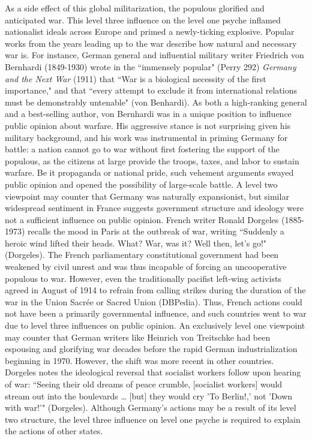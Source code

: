 \documentclass[letterpaper]{article}
\begin{document}
  As a side effect of this global militarization, the populous glorified and anticipated war. This level three influence on the level one psyche inflamed nationalist ideals across Europe and primed a newly-ticking explosive.
  Popular works from the years leading up to the war describe how natural and necessary war is.
  For instance, German general and influential military writer Friedrich von Bernhardi (1849-1930) wrote in the ``immensely popular" (Perry 292) \emph{Germany and the Next War} (1911) that ``War is a biological necessity of the first importance," and that ``every attempt to exclude it from international relations must be demonstrably untenable" (von Benhardi).
  As both a high-ranking general and a best-selling author, von Bernhardi was in a unique position to influence public opinion about warfare. His aggressive stance is not surprising given his military background, and his work was instrumental in priming Germany for battle: a nation cannot go to war without first fostering the support of the populous, as the citizens at large provide the troops, taxes, and labor to sustain warfare. Be it propaganda or national pride, such vehement arguments swayed public opinion and opened the possibility of large-scale battle.
  A level two viewpoint may counter that Germany was naturally expansionist, but similar widespread sentiment in France suggests government structure and ideology were not a sufficient influence on public opinion. French writer Ronald Dorgeles (1885-1973) recalls the mood in Paris at the outbreak of war, writing ``Suddenly a heroic wind lifted their heads. What? War, was it? Well then, let's go!" (Dorgeles).
  The French parliamentary constitutional government had been weakened by civil unrest and was thus incapable of forcing an uncooperative populous to war. However, even the traditionally pacifist left-wing activists agreed in August of 1914 to refrain from calling strikes during the duration of the war in the Union Sacrée or Sacred Union (DBPedia). Thus, French actions could not have been a primarily governmental influence, and such countries went to war due to level three influences on public opinion.
An exclusively level one viewpoint may counter that German writers like Heinrich von Treitschke had been espousing and glorifying war decades before the rapid German industrialization beginning in 1970. However, the shift was more recent in other countries. Dorgeles notes the ideological reversal that socialist workers follow upon hearing of war: ``Seeing their old dreams of peace crumble, [socialist workers] would stream out into the boulevards \ldots{} [but] they would cry 'To Berlin!,' not 'Down with war!'" (Dorgeles). Although Germany's actions may be a result of its level two structure, the level three influence on level one psyche is required to explain the actions of other states.
\end{document}
